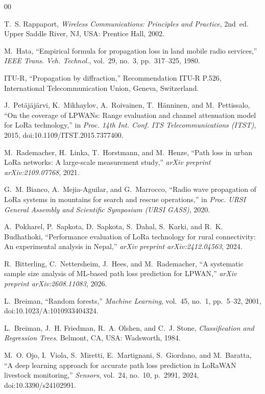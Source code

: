 \documentclass[conference]{IEEEtran}
\begin{document}
\begin{thebibliography}{00}

T.~S. Rappaport, \emph{Wireless Communications: Principles and Practice}, 2nd~ed. Upper Saddle River, NJ, USA: Prentice Hall, 2002.

M.~Hata, ``Empirical formula for propagation loss in land mobile radio services,'' \emph{IEEE Trans. Veh. Technol.}, vol.~29, no.~3, pp.~317--325, 1980.

ITU-R, ``Propagation by diffraction,'' Recommendation ITU-R P.526, International Telecommunication Union, Geneva, Switzerland.

J.~Petäjäjärvi, K.~Mikhaylov, A.~Roivainen, T.~Hänninen, and M.~Pettissalo, ``On the coverage of LPWANs: Range evaluation and channel attenuation model for LoRa technology,'' in \emph{Proc. 14th Int. Conf. ITS Telecommunications (ITST)}, 2015, doi:10.1109/ITST.2015.7377400.

M.~Rademacher, H.~Linka, T.~Horstmann, and M.~Henze, ``Path loss in urban LoRa networks: A large-scale measurement study,'' \emph{arXiv preprint arXiv:2109.07768}, 2021.

G.~M. Bianco, A.~Mejia-Aguilar, and G.~Marrocco, ``Radio wave propagation of LoRa systems in mountains for search and rescue operations,'' in \emph{Proc. URSI General Assembly and Scientific Symposium (URSI GASS)}, 2020.

A.~Pokharel, P.~Sapkota, D.~Sapkota, S.~Dahal, S.~Karki, and R.~K. Budhathoki, ``Performance evaluation of LoRa technology for rural connectivity: An experimental analysis in Nepal,'' \emph{arXiv preprint arXiv:2412.04563}, 2024.

R.~Bitterling, C.~Nettersheim, J.~Hees, and M.~Rademacher, ``A systematic sample size analysis of ML-based path loss prediction for LPWAN,'' \emph{arXiv preprint arXiv:2608.11083}, 2026.

L.~Breiman, ``Random forests,'' \emph{Machine Learning}, vol.~45, no.~1, pp.~5--32, 2001, doi:10.1023/A:1010933404324.

L.~Breiman, J.~H. Friedman, R.~A. Olshen, and C.~J. Stone, \emph{Classification and Regression Trees}. Belmont, CA, USA: Wadsworth, 1984.

M.~O. Ojo, I.~Viola, S.~Miretti, E.~Martignani, S.~Giordano, and M.~Baratta, ``A deep learning approach for accurate path loss prediction in LoRaWAN livestock monitoring,'' \emph{Sensors}, vol.~24, no.~10, p.~2991, 2024, doi:10.3390/s24102991.


\end{thebibliography}
\end{document}
